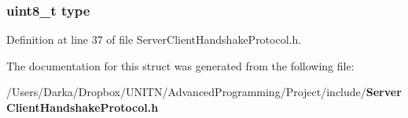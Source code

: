 \subsubsection[{type}]{\setlength{\rightskip}{0pt plus 5cm}uint8\+\_\+t type}\label{structhandshake_a1d127017fb298b889f4ba24752d08b8e}


Definition at line 37 of file Server\+Client\+Handshake\+Protocol.\+h.



The documentation for this struct was generated from the following file\+:\begin{DoxyCompactItemize}
\item 
/\+Users/\+Darka/\+Dropbox/\+U\+N\+I\+T\+N/\+Advanced\+Programming/\+Project/include/{\bf Server\+Client\+Handshake\+Protocol.\+h}\end{DoxyCompactItemize}
